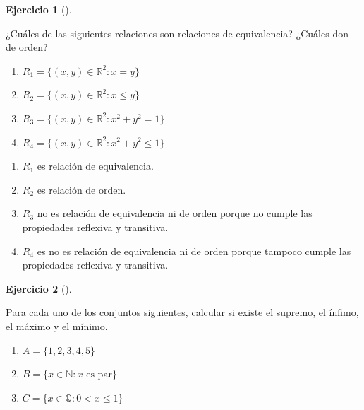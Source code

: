 \documentclass[
  a4paper,
]{scrreport}
\providecommand{\tightlist}{%
  \setlength{\itemsep}{0pt}\setlength{\parskip}{0pt}}\usepackage{longtable,booktabs,array}
\theoremstyle{definition}
\newtheorem{exercise}{Ejercicio}[chapter]
\theoremstyle{remark}
\begin{document}
\leavevmode{}%
\begin{exercise}[]\label{exr-relaciones-equivalencia}

¿Cuáles de las siguientes relaciones son relaciones de equivalencia?
¿Cuáles don de orden?

\begin{enumerate}
\def\labelenumi{\alph{enumi}.}
\tightlist
\item
  \(R_1=\{(x,y)\in \mathbb{R}^2: x = y\}\)
\item
  \(R_2=\{(x,y)\in \mathbb{R}^2: x\leq y\}\)
\item
  \(R_3=\{(x,y)\in \mathbb{R}^2: x^2 + y^2 = 1\}\)
\item
  \(R_4=\{(x,y)\in \mathbb{R}^2: x^2 + y^2 \leq 1\}\)
\end{enumerate}

\end{exercise}

\begin{tcolorbox}[enhanced jigsaw, coltitle=black, left=2mm, opacityback=0, colback=white, opacitybacktitle=0.6, breakable, colbacktitle=quarto-callout-tip-color!10!white, leftrule=.75mm, toptitle=1mm, arc=.35mm, bottomtitle=1mm, rightrule=.15mm, titlerule=0mm, title=\textcolor{quarto-callout-tip-color}{\faLightbulb}\hspace{0.5em}{Solución}, colframe=quarto-callout-tip-color-frame, toprule=.15mm, bottomrule=.15mm]

\begin{enumerate}
\def\labelenumi{\alph{enumi}.}
\tightlist
\item
  \(R_1\) es relación de equivalencia.
\item
  \(R_2\) es relación de orden.
\item
  \(R_3\) no es relación de equivalencia ni de orden porque no cumple
  las propiedades reflexiva y transitiva.
\item
  \(R_4\) es no es relación de equivalencia ni de orden porque tampoco
  cumple las propiedades reflexiva y transitiva.
\end{enumerate}

\end{tcolorbox}

\leavevmode{}%
\begin{exercise}[]\label{exr-supremo-infimo-maximo-minimo}

Para cada uno de los conjuntos siguientes, calcular si existe el
supremo, el ínfimo, el máximo y el mínimo.

\begin{enumerate}
\def\labelenumi{\alph{enumi}.}
\tightlist
\item
  \(A=\{1, 2, 3, 4, 5\}\)
\item
  \(B=\{x\in\mathbb{N} : x \mbox{ es par}\}\)
\item
  \(C=\{x\in\mathbb{Q} : 0< x \leq 1\}\)
\end{enumerate}

\end{exercise}
\end{document}
